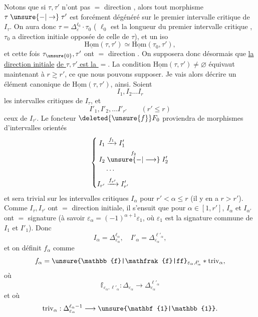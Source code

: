 Notons que si $\tau,\tau'$ n'ont pas $=$ direction , alors tout morphisme $\tau\mathrel{\unsure{-|\to}}\tau'$ est forcément dégénéré sur le premier intervalle critique de $I_\tau$.  On aura donc $\tau=\Delta_\varepsilon^{\ell_0}\cdot\tau_0$ ( $\ell_0$ est la longueur du premier intervalle critique ,  $\tau_0$ a direction initiale opposée de celle de $\tau$), et un iso
\[
\underline{\mathrm{Hom}}(\tau,\tau')\simeq\underline{\mathrm{Hom}}(\tau_0,\tau'),
\]
et cette fois $\tau_{\unsure{0}},\tau'$ ont $=$ direction . On supposera donc désormais que \uline{la direction initiale} \uline{de $\tau,\tau'$ est la $=$}. La condition $\underline{\mathrm{Hom}}(\tau,\tau')\ne\varnothing$ équivaut maintenant à $\underline{r\geq r'}$, ce que nous pouvons supposer. Je vais alors décrire un élément canonique
 de $\underline{\mathrm{Hom}}(\tau,\tau')$, ainsi. Soient
\[
I_1,I_2\ldots I_r
\]
les intervalles critiques de $I_\tau$, et
\[
I'_1,I'_2,\ldots I'_{r'}\qquad(r'\leq r)
\]
ceux de $I_{\tau'}$. Le foncteur $\deleted{\unsure{f}}F_0$ proviendra de morphismes d'intervalles orientés 
\[
\left\{\begin{aligned}
I_1&\xrightarrow{f_1}I'_1\\
I_2&\mathrel{\overset{f_2}{\unsure{-|\longrightarrow}}}I'_2\\
&\cdots\\
I_{r'}&\xrightarrow{f_{r'}}I'_{r'}
\end{aligned}\right.
\]
et sera  trivial sur les intervalles critiques $I_\alpha$ pour $r'<\alpha\leq r$ (il y en a  $r>r'$). Comme $I_\tau,I_{\tau'}$ ont $=$ direction initiale,  il s'ensuit que pour $\alpha\in[1,r']$, $I_\alpha$ et $I_{\alpha'}$ ont $=$ signature (à savoir $\varepsilon_\alpha=(-1)^{\alpha+1}\varepsilon_1$, où $\varepsilon_1$ est la signature commune de $I_1$ et $I'_1$). Donc
\[
I_\alpha=\Delta_{\varepsilon_\alpha}^{\ell_\alpha},\quad I'_\alpha=\Delta_{\varepsilon_\alpha}^{\ell'_\alpha},
\]
et on définit $f_\alpha$ comme 
\[
f_\alpha=\unsure{\mathbb{f}|\mathfrak{f}|ff}_{\varepsilon_\alpha,\ell'_\alpha}*\mathrm{triv}_\alpha,
\]
où
\[
\mathbb{f}_{\varepsilon_\alpha,\ell'_\alpha}:\Delta_{\varepsilon_\alpha}\longrightarrow\Delta_{\varepsilon_\alpha}^{\ell'_\alpha}
\]
et où
\[
\mathrm{triv}_\alpha:\Delta_{\varepsilon_\alpha}^{\ell_\alpha-1}\longrightarrow\unsure{\mathbf{1}|\mathbb{1}}.
\]

